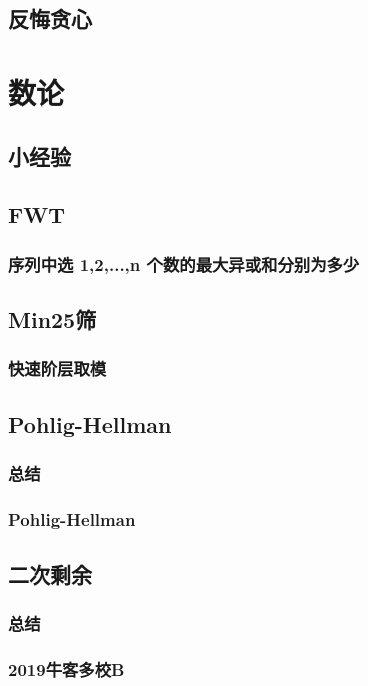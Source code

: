 \documentclass[10pt,a4paper]{article}
\begin{document}
	\subsection{反悔贪心}
	
	\section{数论}
	\subsection{小经验}
	
	\subsection{FWT}
	\subsubsection{序列中选 1,2,...,n 个数的最大异或和分别为多少}
	
	\subsection{Min25筛}
	\subsubsection{快速阶层取模}
	
	\subsection{Pohlig-Hellman}
	\subsubsection{总结}
	
	\subsubsection{Pohlig-Hellman}
	
	\subsection{二次剩余}
	\subsubsection{总结}
	
	\subsubsection{2019牛客多校B}
	
\end{document}
